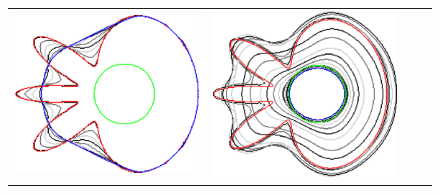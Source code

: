 \begin{figure}
\begin{tabular}{cccc}
\includegraphics[scale=0.2]{figures/chapter9/free-elastica/balanceflow/flower/len_pen-0.01/radius-7/summary.pdf} &
\includegraphics[scale=0.2]{figures/chapter9/free-elastica/graphflow/flower/len_pen-0.01/radius-7/summary.pdf} \\[1em]

\end{tabular}
\end{figure}
